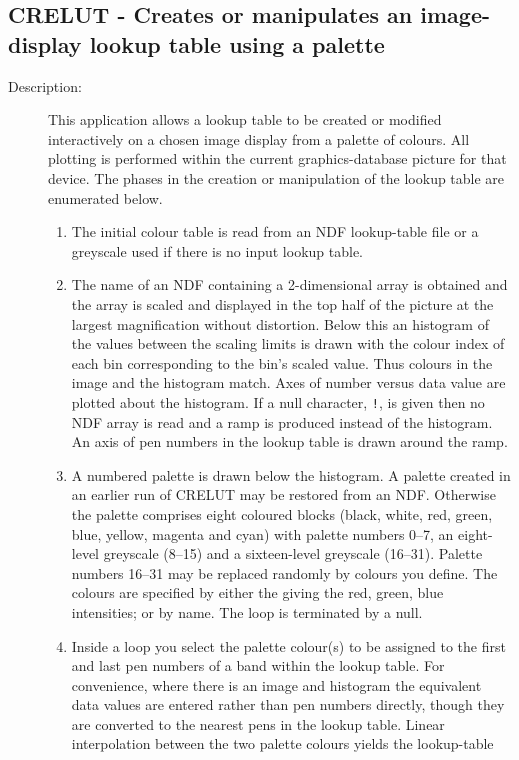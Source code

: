\documentclass[twoside,11pt]{article}
\newcommand{\stardocinitials}  {SUN}
\newcommand{\stardocnumber}    {239.2}
\newcommand{\stardocname}{\stardocinitials /\stardocnumber}
\newcommand{\xlabel}[1]{}
\newlength{\sstbannerlength}
\newlength{\sstcaptionlength}
\newlength{\sstexampleslength}
\newlength{\sstexampleswidth}
\newcommand{\sstroutine}[3]{
   \goodbreak
   \markboth{{\stardocname}~ --- #1}{{\stardocname}~ --- #1}
   \rule{\textwidth}{0.5mm}
   \vspace{-7ex}
   \newline
   \settowidth{\sstbannerlength}{{\Large {\bf #1}}}
   \setlength{\sstcaptionlength}{\textwidth}
   \setlength{\sstexampleslength}{\textwidth}
   \addtolength{\sstbannerlength}{0.5em}
   \addtolength{\sstcaptionlength}{-2.0\sstbannerlength}
   \addtolength{\sstcaptionlength}{-4.9pt}
   \settowidth{\sstexampleswidth}{{\bf Examples:}}
   \addtolength{\sstexampleslength}{-\sstexampleswidth}
   \parbox[t]{\sstbannerlength}{\flushleft{\Large {\bf #1}}}
   \parbox[t]{\sstcaptionlength}{\center{\Large #2}}
   \parbox[t]{\sstbannerlength}{\flushright{\Large {\bf #1}}}
   \begin{description}
      #3
   \end{description}
}
\newcommand{\sstdescription}[1]{\item[Description:] #1}
\renewcommand{\sstroutine}[3]{
      \subsection{#1\xlabel{#1}-\label{#1}#2}
      \begin{description}
         #3
      \end{description}
   }
\renewcommand{\sstdescription}[1]{\item[Description:]
      \begin{description}
         #1
      \end{description}
   }
\begin{document}
\sstroutine{
   CRELUT
}{
   Creates or manipulates an image-display lookup table using a
   palette
}{
   \sstdescription{
      This application allows a lookup table to be created or modified
      interactively on a chosen image display from a palette of
      colours.  All plotting is performed within the current
      graphics-database picture for that device.  The phases in the
      creation or manipulation of the lookup table are enumerated below.
      \begin{enumerate}
      \item The initial colour table is read from an NDF lookup-table file
         or a greyscale used if there is no input lookup table.
      \item The name of an NDF containing a 2-dimensional array is obtained and the
         array is scaled and displayed in the top half of the picture
         at the largest magnification without distortion.  Below this an
         histogram of the values between the scaling limits is drawn
         with the colour index of each bin corresponding to the bin's
         scaled value. Thus colours in the image and the histogram
         match.   Axes of number versus data value are plotted about
         the histogram. If a null character, {\tt !}, is given then no NDF
         array is read and a ramp is produced instead of the histogram.
         An axis of pen numbers in the lookup table is drawn around the
         ramp.
      \item A numbered palette is drawn below the histogram.  A palette
         created in an earlier run of CRELUT may be restored from an
         NDF.  Otherwise the palette comprises eight coloured blocks
         (black, white, red, green, blue, yellow, magenta and cyan)
         with palette numbers 0--7, an eight-level greyscale (8--15)
         and a sixteen-level greyscale (16--31).  Palette numbers
         16--31 may be replaced randomly by colours you define.  The
         colours are specified by either the giving the red, green, blue
         intensities; or by name.  The loop is terminated by a null.
      \item Inside a loop you select the palette colour(s) to be
         assigned to the first and last pen numbers of a band within
         the lookup table.  For convenience, where there is an image
         and histogram the equivalent data values are entered rather
         than pen numbers directly, though they are converted to the
         nearest pens in the lookup table.  Linear interpolation
         between the two palette colours yields the lookup-table

\end{enumerate}}}
\end{document}
